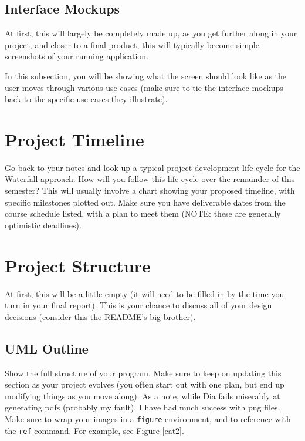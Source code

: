 \documentclass[10pt,conference,onecolumn,compsoc]{IEEEtran}
\begin{document}
\subsection{Interface Mockups}
At first, this will largely be completely made up, as you get further along in your project, and closer to a final product, this will typically become simple screenshots of your running application.

In this subsection, you will be showing what the screen should look like as the user moves through various use cases (make sure to tie the interface mockups back to the specific use cases they illustrate).



\section{Project Timeline}
Go back to your notes and look up a typical project development life cycle for the Waterfall approach.  How will you follow this life cycle over the remainder of this semester?  This will usually involve a chart showing your proposed timeline, with specific milestones plotted out.  Make sure you have deliverable dates from the course schedule listed, with a plan to meet them (NOTE: these are generally optimistic deadlines).

\section{Project Structure}
At first, this will be a little empty (it will need to be filled in by the time you turn in your final report).  This is your chance to discuss all of your design decisions (consider this the README's big brother).

\subsection{UML Outline}
Show the full structure of your program.  Make sure to keep on updating this section as your project evolves (you often start out with one plan, but end up modifying things as you move along).  As a note, while Dia fails miserably at generating pdfs (probably my fault), I have had much success with png files.  Make sure to wrap your images in a \texttt{figure} environment, and to reference with the \texttt{ref} command.  For example, see Figure \ref{cat2}.
\end{document}
